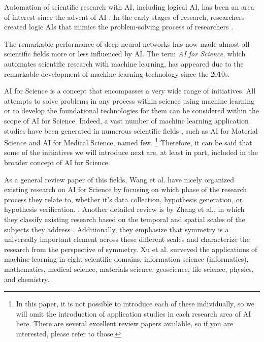Automation of scientific research with AI, including logical AI, has been an area of interest since the advent of AI \cite{langley1987scientific}. In the early stages of research, researchers created logic AIs that mimics the problem-solving process of researchers \cite{lindsay1993dendral}.

The remarkable performance of deep neural networks has now made almost all scientific fields more or less influenced by AI. The term \textit{AI for Science}, which automates scientific research with machine learning, has appeared due to the remarkable development of machine learning technology since the 2010s. 

AI for Science is a concept that encompasses a very wide range of initiatives. All attempts to solve problems in any process within science using machine learning or to develop the foundational technologies for them can be considered within the scope of AI for Science. Indeed, a vast number of machine learning application studies have been generated in numerous scientific fields \cite{xu2021artificial}, such as AI for Material Science and AI for Medical Science, named few.
\footnote{In this paper, it is not possible to introduce each of these individually, so we will omit the introduction of application studies in each research area of AI here. There are several excellent review papers available, so if you are interested, please refer to those.}
Therefore, it can be said that some of the initiatives we will introduce next are, at least in part, included in the broader concept of AI for Science.

As a general review paper of this fields, Wang et al. have nicely organized existing research on AI for Science by focusing on which phase of
the research process they relate to, whether it’s data collection, hypothesis generation, or hypothesis
verification. \cite{wang2023scientific}. Another detailed review is by Zhang et al., in which they classify existing research based on the temporal and spatial scales of the subjects they address \cite{zhang2023artificial}. Additionally, they emphasize that symmetry is a universally important element across
these different scales and characterize the research from the perspective of symmetry. Xu et al. \cite{xu2021artificial} surveyed the applications of machine learning in eight scientific domains, information science (informatics), mathematics, medical science,
materials science, geoscience, life science, physics, and chemistry.



